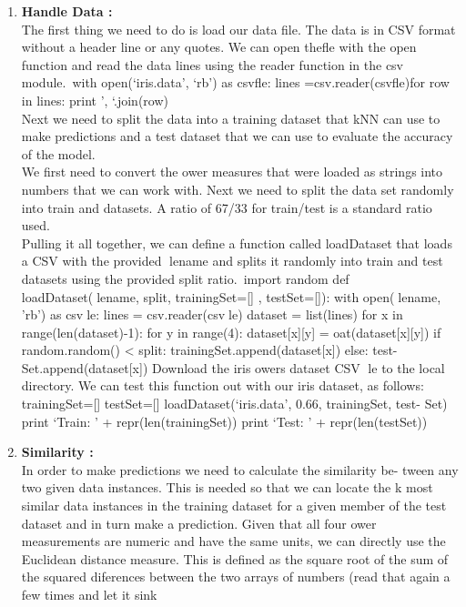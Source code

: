 \documentclass{article}
\begin{document}
	\begin{enumerate}
		\item \textbf{Handle Data :}\\The first thing we need to do is load our data file. The data is in CSV format without a header line or any quotes. We can open thefle with the open function and read the data lines using the reader function in the csv module.\ with open(`iris.data', `rb') as csvfle: lines =csv.reader(csvfle)for row in lines: print ', `.join(row)\\Next we need to split the data into a training dataset that kNN can use to make predictions and a test dataset that we can use to evaluate
		the accuracy of the model.\\We first need to convert the ower measures that were loaded as strings
		into numbers that we can work with. Next we need to split the data set randomly into train and datasets. A ratio of 67/33 for train/test is a standard ratio used.\\Pulling it all together, we can define a function called loadDataset that loads a CSV with the provided lename and splits it randomly into train and test datasets using the provided split ratio.\
		import random
		def loadDataset(lename, split, trainingSet=[] , testSet=[]): with
		open(lename, 'rb') as csvle: lines = csv.reader(csvle) dataset =
		list(lines) for x in range(len(dataset)-1): for y in range(4): dataset[x][y]
		= 
		oat(dataset[x][y])
		if random.random() < split: trainingSet.append(dataset[x]) else: test-
		Set.append(dataset[x])
		Download the iris 
		owers dataset CSV le to the local directory. We
		can test this function out with our iris dataset, as follows:
		trainingSet=[] testSet=[] loadDataset(`iris.data', 0.66, trainingSet, test-
		Set) print `Train: ' + repr(len(trainingSet)) print `Test: ' + repr(len(testSet))
		\item \textbf{Similarity :}\\In order to make predictions we need to calculate the similarity be-
		tween any two given data instances. This is needed so that we can locate the k most similar data instances in the training dataset for a given member of the test dataset and in turn make a prediction. Given that all four  ower measurements are numeric and have the same
		units, we can directly use the Euclidean distance measure. This is defined as the square root of the sum of the squared diferences between the two arrays of numbers (read that again a few times and let it sink

\end{enumerate}
\end{document}
